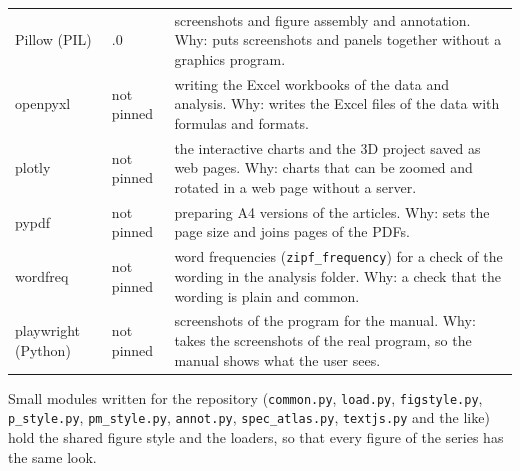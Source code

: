 \begin{table}[H]
\begin{tabular}{@{}>{\raggedright\arraybackslash}p{2.7cm}>{\raggedright\arraybackslash}p{1.7cm}>{\raggedright\arraybackslash}p{8.6cm}@{}}
Pillow (PIL) & 12.3.0 & screenshots and figure assembly and annotation. Why: puts screenshots and panels together without a graphics program.\\
openpyxl & not pinned & writing the Excel workbooks of the data and analysis. Why: writes the Excel files of the data with formulas and formats.\\
plotly & not pinned & the interactive charts and the 3D project saved as web pages. Why: charts that can be zoomed and rotated in a web page without a server.\\
pypdf & not pinned & preparing A4 versions of the articles. Why: sets the page size and joins pages of the PDFs.\\
wordfreq & not pinned & word frequencies (\texttt{zipf\_frequency}) for a check of the wording in the analysis folder. Why: a check that the wording is plain and common.\\
playwright (Python) & not pinned & screenshots of the program for the manual. Why: takes the screenshots of the real program, so the manual shows what the user sees.\\
\bottomrule\end{tabular}\end{table}
Small modules written for the repository (\texttt{common.py}, \texttt{load.py}, \texttt{figstyle.py}, \texttt{p\_style.py}, \texttt{pm\_style.py}, \texttt{annot.py}, \texttt{spec\_atlas.py}, \texttt{textjs.py} and the like) hold the shared figure style and the loaders, so that every figure of the series has the same look.

